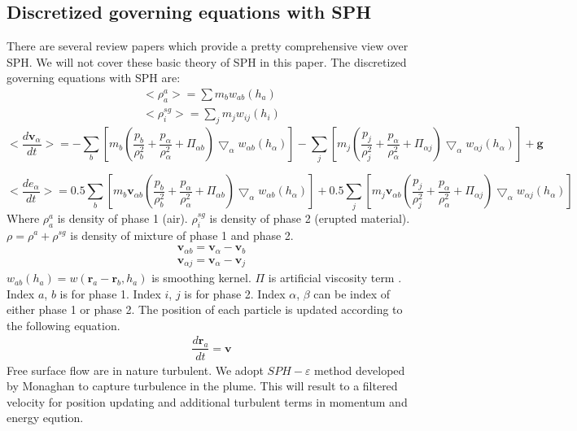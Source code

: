\documentclass[10pt,a4paper]{article}
\begin{document}
\subsection{Discretized governing equations with SPH}
There are several review papers \citep{monaghan1992smoothed, monaghan2005smoothed, price2012smoothed, rosswog2009astrophysical, monaghan2012smoothed} which provide a pretty comprehensive view over SPH. We will not cover these basic theory of SPH in this paper.
The discretized governing equations with SPH are:
\begin{align}
<\rho_a^a>=\sum m_b w_{ab} (h_a) \label{eq:gov-sph-d1}\\
<\rho_i^{sg}>=\sum_j m_j w_{ij} (h_i) \label{eq:gov-sph-d2}
\end{align}
\begin{equation}
<\dfrac{d \textbf{v}_{\alpha}}{d t}>= 
-\sum_b [m_b (\dfrac{p_b}{\rho_b^2} + \dfrac{p_{\alpha}}{\rho_{\alpha}^2} + \Pi_{\alpha b}) \bigtriangledown_{\alpha}w_{\alpha b}(h_{\alpha})]
-\sum_j [m_j (\dfrac{p_j}{\rho_j^2} + \dfrac{p_{\alpha}}{\rho_{\alpha}^2} + \Pi_{\alpha j}) \bigtriangledown_{\alpha}w_{\alpha j}(h_{\alpha})]
+\textbf{g} \label{eq:gov-sph-v}
\end{equation}

\begin{equation}
<\dfrac{d e_{\alpha}}{d t}>=
 0.5\sum_b [m_b \textbf{v}_{\alpha b}(\dfrac{p_b}{\rho_b^2} + \dfrac{p_{\alpha}}{\rho_{\alpha}^2} + \Pi_{\alpha b}) \bigtriangledown_{\alpha}w_{\alpha b}(h_{\alpha})]
 +0.5\sum_j [m_j \textbf{v}_{\alpha b}(\dfrac{p_j}{\rho_j^2} + \dfrac{p_{\alpha}}{\rho_{\alpha}^2} + \Pi_{\alpha j}) \bigtriangledown_{\alpha}w_{\alpha j}(h_{\alpha})] \label{eq:gov-sph-e}
\end{equation}
Where
$\rho_a^a$ is density of phase 1 (air).
$\rho_i^{sg}$ is density of phase 2 (erupted material).
$\rho=\rho^a + \rho^{sg}$ is density of mixture of phase 1 and phase 2.
\begin{align}
\textbf{v}_{\alpha b}=\textbf{v}_{\alpha}-\textbf{v}_b \\
\textbf{v}_{\alpha j}=\textbf{v}_{\alpha}-\textbf{v}_j
\end{align}
$w_{ab} (h_a)= w(\textbf{r}_a-\textbf{r}_b,h_a)$ is smoothing kernel.
$\Pi$ is artificial viscosity term \citep{monaghan1992smoothed}.
Index $a$, $b$ is for phase 1.
Index $i$, $j$ is for phase 2.
Index $\alpha$, $\beta$ can be index of either phase 1 or phase 2.
The position of each particle is updated according to the following equation.
\begin{align}
\dfrac{d \textbf{r}_a}{dt} = \textbf{v} \label{eq:gov-update-pos}
\end{align}
Free surface flow are in nature turbulent. We adopt $SPH-\varepsilon$ method developed by Monaghan\cite{monaghan2011turbulence} to capture turbulence in the plume. This will result to a filtered velocity for position updating and additional turbulent terms in momentum and energy eqution.
\end{document}
